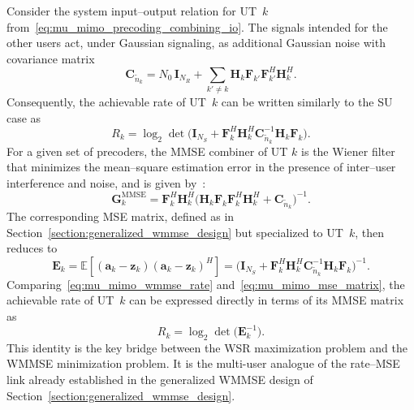 Consider the system input--output relation for \ac{UT}~$k$ from~\eqref{eq:mu_mimo_precoding_combining_io}.
The signals intended for the other users act, under Gaussian signaling, as additional Gaussian noise with covariance matrix
\begin{equation}
\label{eq:effective_noise_covariance}
    \mathbf{C}_{\tilde{n}_k} = N_0 \, \mathbf{I}_{N_R} + \sum_{k' \neq k} \mathbf{H}_k \mathbf{F}_{k'} \mathbf{F}_{k'}^H \mathbf{H}_k^H.
\end{equation}
Consequently, the achievable rate of \ac{UT}~$k$ can be written similarly to the \ac{SU} case as
\begin{equation}
\label{eq:mu_mimo_wmmse_rate}
    R_k = \log_2 \det\!\Big(\mathbf{I}_{N_S} + \mathbf{F}_k^H \mathbf{H}_k^H \mathbf{C}_{\tilde{n}_k}^{-1} \mathbf{H}_k \mathbf{F}_k\Big).
\end{equation}
For a given set of precoders, the \acf{MMSE} combiner of \ac{UT} $k$ is the Wiener filter that minimizes the mean--square estimation error in the presence of inter--user interference and noise, and is given by~\cite{MMSE_receive_filter}:
\begin{equation}
\label{eq:mu_mimo_mmse_combiner}
    \mathbf{G}_k^{\mathrm{MMSE}} = \mathbf{F}_k^H \mathbf{H}_k^H \big(\mathbf{H}_k \mathbf{F}_k \mathbf{F}_k^H \mathbf{H}_k^H + \mathbf{C}_{\tilde{n}_k}\big)^{-1}.
\end{equation}
The corresponding \ac{MSE} matrix, defined as in Section~\ref{section:generalized_wmmse_design} but specialized to \ac{UT}~$k$, then reduces to~\cite{WMMSE_precoding_ref15}
\begin{equation}
\label{eq:mu_mimo_mse_matrix}
    \mathbf{E}_k 
    = \mathbb{E}\!\left[(\mathbf{a}_k - \mathbf{z}_k)(\mathbf{a}_k - \mathbf{z}_k)^H\right]
    = \big(\mathbf{I}_{N_S} + \mathbf{F}_k^H \mathbf{H}_k^H \mathbf{C}_{\tilde{n}_k}^{-1} \mathbf{H}_k \mathbf{F}_k\big)^{-1}.
\end{equation}
Comparing~\eqref{eq:mu_mimo_wmmse_rate} and~\eqref{eq:mu_mimo_mse_matrix}, the achievable rate of \ac{UT}~$k$ can be expressed directly in terms of its \ac{MMSE} matrix as~\cite{WMMSE_precoding}
\begin{equation}
\label{eq:mu_mimo_rate_mse_relation}
    R_k = \log_2 \det\!\big(\mathbf{E}_k^{-1}\big).
\end{equation}
This identity is the key bridge between the \ac{WSR} maximization problem and the \acs{WMMSE} minimization problem.
It is the multi-user analogue of the rate--MSE link already established in the generalized \ac{WMMSE} design of Section~\ref{section:generalized_wmmse_design}.
\medskip

